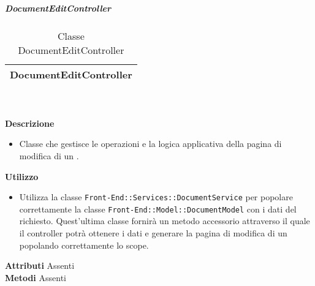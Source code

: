 			\subparagraph{DocumentEditController} 
\begin{table}[ht]
\begin{center}
\bgroup
	\setlength{\arrayrulewidth}{0.6mm}
	\def\arraystretch{1}
		\begin{tabular}{ | p{12cm} | }
				\hline  
					\centerline{\textbf{DocumentEditController}}
		\\ \hline 
				\hline
				\hline
		
		\end{tabular}
\egroup
\caption{Classe DocumentEditController}
\end{center}
\end{table} \textbf{\\ \\ Descrizione}
\begin{itemize}
\item[] Classe che gestisce le operazioni e la logica applicativa della pagina di modifica di un .
\end{itemize} 
\textbf{Utilizzo}
\begin{itemize}
\item[] Utilizza la classe \texttt{Front-End::Services::DocumentService} per popolare correttamente la classe \texttt{Front-End::Model::DocumentModel} con i dati del  richiesto. Quest'ultima classe fornirà un metodo accessorio attraverso il quale il controller potrà ottenere i dati e generare la pagina di modifica di un  popolando correttamente lo scope.
\end{itemize}
\textbf{Attributi}
Assenti \\
\textbf{Metodi}
Assenti \\

